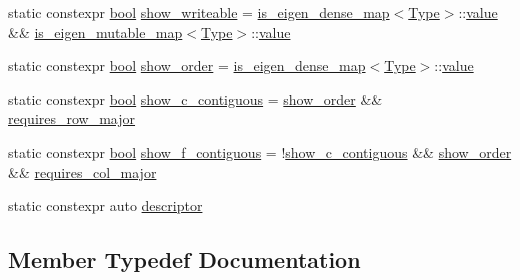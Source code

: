 \begin{DoxyCompactItemize}
static constexpr \mbox{\hyperlink{asdl_8h_af6a258d8f3ee5206d682d799316314b1}{bool}} \mbox{\hyperlink{struct_eigen_props_a028698ea3f672d4a0e95922dc6553f23}{show\+\_\+writeable}} = \mbox{\hyperlink{eigen_8h_a403c575c8e7ae68daa89a11a4b683038}{is\+\_\+eigen\+\_\+dense\+\_\+map}}$<$\mbox{\hyperlink{struct_eigen_props_ababed0b6298eeb5f4ded06da92c96cd7}{Type}}$>$\+::\mbox{\hyperlink{_s_d_l__opengl__glext_8h_a8ad81492d410ff2ac11f754f4042150f}{value}} \&\& \mbox{\hyperlink{eigen_8h_aabbcc3f1a17addf39e1577576553acf5}{is\+\_\+eigen\+\_\+mutable\+\_\+map}}$<$\mbox{\hyperlink{struct_eigen_props_ababed0b6298eeb5f4ded06da92c96cd7}{Type}}$>$\+::\mbox{\hyperlink{_s_d_l__opengl__glext_8h_a8ad81492d410ff2ac11f754f4042150f}{value}}
\item 
static constexpr \mbox{\hyperlink{asdl_8h_af6a258d8f3ee5206d682d799316314b1}{bool}} \mbox{\hyperlink{struct_eigen_props_ae3040a55462cdeaed7843ba858eb8e68}{show\+\_\+order}} = \mbox{\hyperlink{eigen_8h_a403c575c8e7ae68daa89a11a4b683038}{is\+\_\+eigen\+\_\+dense\+\_\+map}}$<$\mbox{\hyperlink{struct_eigen_props_ababed0b6298eeb5f4ded06da92c96cd7}{Type}}$>$\+::\mbox{\hyperlink{_s_d_l__opengl__glext_8h_a8ad81492d410ff2ac11f754f4042150f}{value}}
\item 
static constexpr \mbox{\hyperlink{asdl_8h_af6a258d8f3ee5206d682d799316314b1}{bool}} \mbox{\hyperlink{struct_eigen_props_a280202108f280aab1ccbe5f9e946a8eb}{show\+\_\+c\+\_\+contiguous}} = \mbox{\hyperlink{struct_eigen_props_ae3040a55462cdeaed7843ba858eb8e68}{show\+\_\+order}} \&\& \mbox{\hyperlink{struct_eigen_props_a71445c69c5e4084c30449ff2207571c7}{requires\+\_\+row\+\_\+major}}
\item 
static constexpr \mbox{\hyperlink{asdl_8h_af6a258d8f3ee5206d682d799316314b1}{bool}} \mbox{\hyperlink{struct_eigen_props_ae9fd27ba9318cfb3d632f80bfc04e94f}{show\+\_\+f\+\_\+contiguous}} = !\mbox{\hyperlink{struct_eigen_props_a280202108f280aab1ccbe5f9e946a8eb}{show\+\_\+c\+\_\+contiguous}} \&\& \mbox{\hyperlink{struct_eigen_props_ae3040a55462cdeaed7843ba858eb8e68}{show\+\_\+order}} \&\& \mbox{\hyperlink{struct_eigen_props_a070c53f0e952e411c98e3ddfdbeaae3d}{requires\+\_\+col\+\_\+major}}
\item 
static constexpr auto \mbox{\hyperlink{struct_eigen_props_aa3861d665ff4bf5df6b531008fe358ef}{descriptor}}
\end{DoxyCompactItemize}


\subsection{Member Typedef Documentation}
\mbox{\label{struct_eigen_props_aa728072a2702217ee987bf9ab3b9d07d}} 
